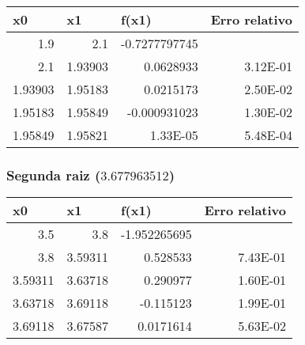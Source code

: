 \documentclass[12pt]{article}
\begin{document}
\begin{table}[H]
\centering
\begin{tabular}{@{}rrrr@{}}
\toprule
\multicolumn{1}{l}{x0} & \multicolumn{1}{l}{x1} & \multicolumn{1}{l}{f(x1)} & \multicolumn{1}{l}{Erro relativo} \\ \midrule
1.9                    & 2.1                    & -0.7277797745             & \multicolumn{1}{l}{}              \\
2.1                    & 1.93903                & 0.0628933                 & 3.12E-01                          \\
1.93903                & 1.95183                & 0.0215173                 & 2.50E-02                          \\
1.95183                & 1.95849                & -0.000931023              & 1.30E-02                          \\
1.95849                & 1.95821                & 1.33E-05                  & 5.48E-04                         \\ \bottomrule
\end{tabular}
\end{table}

\subsubsection{Segunda raiz (\(3.677963512\))}

\begin{table}[H]
\centering
\begin{tabular}{@{}rrrr@{}}
\toprule
\multicolumn{1}{l}{x0} & \multicolumn{1}{l}{x1} & \multicolumn{1}{l}{f(x1)} & \multicolumn{1}{l}{Erro relativo} \\ \midrule
3.5                    & 3.8                    & -1.952265695              & \multicolumn{1}{l}{}              \\
3.8                    & 3.59311                & 0.528533                  & 7.43E-01                          \\
3.59311                & 3.63718                & 0.290977                  & 1.60E-01                          \\
3.63718                & 3.69118                & -0.115123                 & 1.99E-01                          \\
3.69118                & 3.67587                & 0.0171614                 & 5.63E-02                         \\ \bottomrule
\end{tabular}
\end{table}
\end{document}
